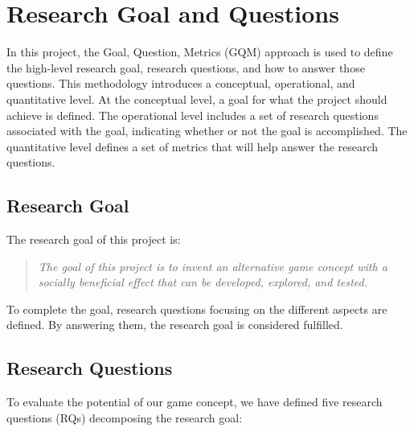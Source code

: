\section{Research Goal and Questions}
\label{chap:research_goal_and_questions}
In this project, the Goal, Question, Metrics (GQM) approach \citep{basili_software_1992} is used to define the high-level research goal, research questions, and how to answer those questions. This methodology introduces a conceptual, operational, and quantitative level. At the conceptual level, a goal for what the project should achieve is defined. The operational level includes a set of research questions associated with the goal, indicating whether or not the goal is accomplished. The quantitative level defines a set of metrics that will help answer the research questions.


\subsection{Research Goal}
\label{sec:research_goal}
The research goal of this project is: 

\begin{quote}\textit{The goal of this project is to invent an alternative game concept with a socially beneficial effect that can be developed, explored, and tested.}
\end{quote}

To complete the goal, research questions focusing on the different aspects are defined. By answering them, the research goal is considered fulfilled.


\subsection{Research Questions}
\label{sec:research_questions}
To evaluate the potential of our game concept, we have defined five research questions (RQs) decomposing the research goal:

